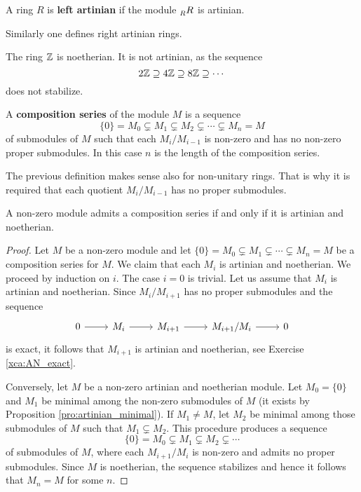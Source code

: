 \begin{definition}
	A ring $R$ is \textbf{left artinian} if the module 
	$\prescript{}{R}R$ is artinian.
\end{definition}

Similarly one defines right artinian rings. 

\begin{example}
	The ring $\mathbb{Z}$ is noetherian. It is not artinian, as the sequence
	\[
	2\mathbb{Z}\supseteq
	4\mathbb{Z}\supseteq 8\mathbb{Z}\supseteq\cdots
	\]
	does not stabilize. 
\end{example}

\begin{definition}
	\label{def:serie_de_composicion}
	A \textbf{composition series} of the module $M$ is a sequence 
	\[
		\{0\}=M_0\subsetneq M_1\subsetneq M_2\subsetneq\cdots\subsetneq M_n=M
	\]
	of submodules of $M$ such that each $M_i/M_{i-1}$ is non-zero and has no non-zero 
	proper submodules. 
	In this case 
	$n$ is the length of the composition series.
\end{definition}

The previous definition makes sense also for non-unitary rings. That is why
it is required that each quotient $M_i/M_{i-1}$ has no proper submodules.

\begin{theorem}
	\label{thm:serie_de_composicion}
	A non-zero module admits a composition series if and only if it is artinian and noetherian.
\end{theorem}

\begin{proof}
	Let $M$ be a non-zero module and let $\{0\}=M_0\subsetneq
	M_1\subsetneq\cdots\subsetneq M_n=M$ be a composition series for $M$.
	We claim that each $M_i$ is artinian and noetherian. We proceed by induction on $i$. The case
	$i=0$ is trivial. Let us assume that $M_i$ is artinian and noetherian. Since 
	$M_i/M_{i+1}$ has no proper submodules and the sequence 
	\[
	\begin{tikzcd}
		0 \arrow{r}
		& M_i \arrow{r}
		& M_{i+1} \arrow{r}
		& M_{i+1}/M_i \arrow{r}
		& 0
	\end{tikzcd}
	\]
	is exact, it follows that 
	$M_{i+1}$ is artinian and noetherian, see Exercise \ref{xca:AN_exact}. 

    Conversely, let $M$ be a non-zero  artinian and noetherian module. Let $M_0=\{0\}$ and 
    $M_1$ be minimal among the non-zero  submodules of $M$ (it exists by Proposition \ref{pro:artinian_minimal}).
    If $M_1\ne M$, let 
	$M_2$ be minimal among those submodules of $M$ such that $M_1\subsetneq M_2$. This procedure
	produces a sequence 
	\[
		\{0\}=M_0\subsetneq M_1\subsetneq M_2\subsetneq\cdots
	\]
	of submodules of $M$, where each $M_{i+1}/M_i$ is non-zero and admits no
	proper submodules. Since $M$ is noetherian, the sequence stabilizes and
	hence it follows that $M_n=M$ for some $n$. 
\end{proof}

